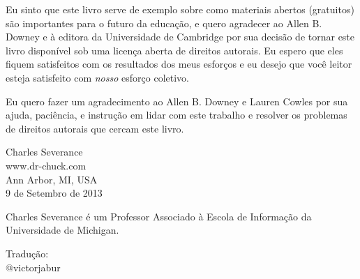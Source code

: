 
Eu sinto que este livro serve de exemplo sobre como materiais
abertos (gratuitos) são importantes para o futuro da educação,
e quero agradecer ao Allen B. Downey e à editora da Universidade de 
Cambridge por sua decisão de tornar este livro disponível sob uma licença
aberta de direitos autorais. Eu espero que eles fiquem satisfeitos com
os resultados dos meus esforços e eu desejo que você leitor esteja satisfeito
com \emph{nosso} esforço coletivo.

Eu quero fazer um agradecimento ao Allen B. Downey e Lauren Cowles por sua ajuda,
paciência, e instrução em lidar com este trabalho e resolver os problemas de 
direitos autorais que cercam este livro.

Charles Severance\\
www.dr-chuck.com\\
Ann Arbor, MI, USA\\
9 de Setembro de 2013

Charles Severance é um 
Professor Associado 
à Escola de Informação da Universidade de Michigan.

Tradução:\\
@victorjabur

\clearemptydoublepage

\begin{latexonly}

\tableofcontents

\clearemptydoublepage

\end{latexonly}

\mainmatter

